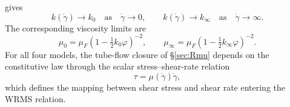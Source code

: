 \documentclass[lineno]{jfm}
\begin{document}
gives
\[
k(\dot\gamma)\rightarrow k_0
\quad\text{as}\quad
\dot\gamma\rightarrow0,
\qquad
k(\dot\gamma)\rightarrow k_\infty
\quad\text{as}\quad
\dot\gamma\rightarrow\infty.
\]
The corresponding viscosity limits are
\begin{equation}
\mu_0
=
\mu_F
\left(
1-\tfrac{1}{2}k_0\varphi
\right)^{-2},
\qquad
\mu_\infty
=
\mu_F
\left(
1-\tfrac{1}{2}k_\infty\varphi
\right)^{-2}.
\label{eq:quemada_limits}
\end{equation}
For all four models, the tube-flow closure of \S\ref{sec:Rmu} depends on the
constitutive law through the scalar stress--shear-rate relation
\begin{equation}
\tau
=
\mu(\dot\gamma)\dot\gamma,
\label{eq:scalar-stress-shear}
\end{equation}
which defines the mapping between shear stress and shear rate entering the WRMS
relation.
\end{document}
